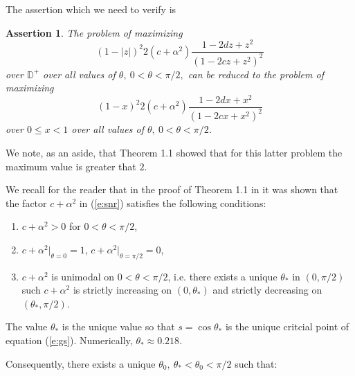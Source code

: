 \documentclass[12pt]{icgft}
\newcommand{\D}{\mathbb D}
\newtheorem{thm}{Assertion}
\theoremstyle{definition}
\numberwithin{equation}{section}
\begin{document}
\vspace{0.1in}

The assertion which we need to verify is

\begin{thm} The problem of maximizing
$$(1-|z|)^2 2(c+\alpha^2)\frac{1 - 2dz + z^2}{(1-2cz +z^2)^2}$$
\noindent over $\D^+$ over all values of $\theta,\  0 < \theta < \pi/2,$ can be reduced to
the problem of maximizing
$$(1-x)^2 2(c+\alpha^2)\frac{1 - 2dx + x^2}{(1-2cx +x^2)^2}$$
\noindent over $0 \le x < 1$ over all values of $\theta,\  0 < \theta < \pi/2$.
\end{thm}

We note, as an aside, that Theorem 1.1 showed that for this latter problem the maximum value is greater that $2$.

\vspace{0.1in}

We recall for the reader that in the proof of Theorem 1.1 in \cite{BCPW} it was shown that the
factor $c+\alpha^2$ in (\ref{e:snr}) satisfies the following conditions:

\vspace{0.1in}

\begin{enumerate}
\item[a.]$c+\alpha^2 > 0$ for $0 < \theta < \pi/2$,

\vspace{0.05in}

\item[b.]$c+\alpha^2 |_{\theta=0} = 1$, $c+\alpha^2 |_{\theta=\pi/2} = 0$,

\vspace{0.05in}

\item[c.]$c+\alpha^2$ is unimodal on $0 < \theta < \pi/2$, i.e. there exists a unique $\theta_*$ in
$(0,\pi/2)$ such $c+\alpha^2$ is strictly increasing on $(0,\theta_*)$ and strictly decreasing on $(\theta_*,\pi/2)$.
\end{enumerate}

\vspace{0.05in}

\noindent The value $\theta_*$ is the unique value so that $s=\cos \theta_*$ is the unique critcial point of equation (\ref{e:gs}).  Numerically, $\theta_* \approx 0.218$.

\vspace{0.05in}

Consequently, there exists a unique $\theta_0, \ \theta_* < \theta_0 < \pi/2$ such that:
\end{document}
